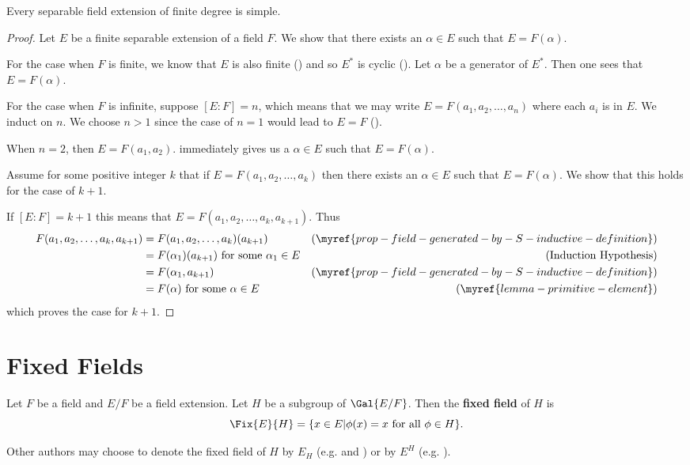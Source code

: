 \begin{theorem}\label{thrm-primitive-element}
    Every separable field extension of finite degree is simple.
\end{theorem}
\begin{proof}
    Let $E$ be a finite separable extension of a field $F$. We show that there exists an $\alpha \in E$ such that $E = F(\alpha)$.

    For the case when $F$ is finite, we know that $E$ is also finite () and so $E^\ast$ is cyclic (). Let $\alpha$ be a generator of $E^\ast$. Then one sees that $E = F(\alpha)$.

    For the case when $F$ is infinite, suppose $[E:F] = n$, which means that we may write $E = F(a_1, a_2, \dots, a_n)$ where each $a_i$ is in $E$. We induct on $n$. We choose $n > 1$ since the case of $n = 1$ would lead to $E = F$ ().

    When $n = 2$, then $E = F(a_1, a_2)$.  immediately gives us a $\alpha \in E$ such that $E = F(\alpha)$.

    Assume for some positive integer $k$ that if $E = F(a_1, a_2, \dots, a_k)$ then there exists an $\alpha \in E$ such that $E = F(\alpha)$. We show that this holds for the case of $k + 1$.

    If $[E:F] = k + 1$ this means that $E = F(a_1, a_2, \dots, a_k, a_{k+1})$. Thus
    \begin{align*}
        F(a_1, a_2, \dots, a_k, a_{k+1}) &= F(a_1, a_2, \dots, a_k)(a_{k+1}) & (\myref{prop-field-generated-by-S-inductive-definition})\\
        &= F(\alpha_1)(a_{k+1}) \text{ for some } \alpha_1 \in E & (\text{Induction Hypothesis})\\
        &= F(\alpha_1, a_{k+1}) & (\myref{prop-field-generated-by-S-inductive-definition})\\
        &= F(\alpha) \text{ for some } \alpha \in E & (\myref{lemma-primitive-element})
    \end{align*}
    which proves the case for $k + 1$.
\end{proof}

\section{Fixed Fields}
\begin{definition}
    Let $F$ be a field and $E/F$ be a field extension. Let $H$ be a subgroup of $\Gal{E/F}$. Then the \textbf{fixed field} of $H$ is
    \[
        \Fix{E}{H} = \{x \in E \vert \phi(x) = x \text{ for all } \phi \in H\}.
    \]
\end{definition}
\begin{remark}
    Other authors may choose to denote the fixed field of $H$ by $E_H$ (e.g. \cite[p.~531]{gallian_2016} and \cite[p.~298]{judson_beezer_2022}) or by $E^H$ (e.g. \cite[p.~486]{artin_2011}).
\end{remark}

